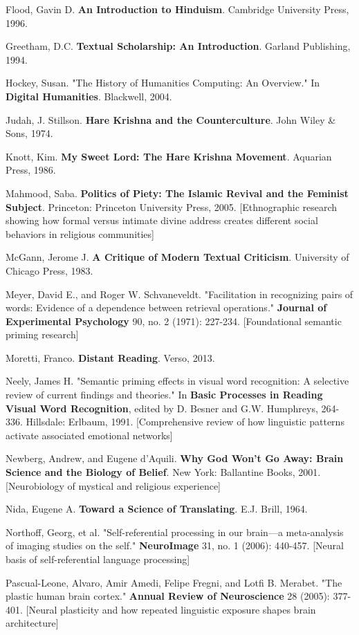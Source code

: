 \documentclass[12pt,twoside]{book}
\begin{document}
Flood, Gavin D. \textbf{An Introduction to Hinduism}. Cambridge University Press, 1996.

Greetham, D.C. \textbf{Textual Scholarship: An Introduction}. Garland Publishing, 1994.

Hockey, Susan. "The History of Humanities Computing: An Overview." In \textbf{Digital Humanities}. Blackwell, 2004.

Judah, J. Stillson. \textbf{Hare Krishna and the Counterculture}. John Wiley \& Sons, 1974.

Knott, Kim. \textbf{My Sweet Lord: The Hare Krishna Movement}. Aquarian Press, 1986.

Mahmood, Saba. \textbf{Politics of Piety: The Islamic Revival and the Feminist Subject}. Princeton: Princeton University Press, 2005. [Ethnographic research showing how formal versus intimate divine address creates different social behaviors in religious communities]

McGann, Jerome J. \textbf{A Critique of Modern Textual Criticism}. University of Chicago Press, 1983.

Meyer, David E., and Roger W. Schvaneveldt. "Facilitation in recognizing pairs of words: Evidence of a dependence between retrieval operations." \textbf{Journal of Experimental Psychology} 90, no. 2 (1971): 227-234. [Foundational semantic priming research]

Moretti, Franco. \textbf{Distant Reading}. Verso, 2013.

Neely, James H. "Semantic priming effects in visual word recognition: A selective review of current findings and theories." In \textbf{Basic Processes in Reading Visual Word Recognition}, edited by D. Besner and G.W. Humphreys, 264-336. Hillsdale: Erlbaum, 1991. [Comprehensive review of how linguistic patterns activate associated emotional networks]

Newberg, Andrew, and Eugene d'Aquili. \textbf{Why God Won't Go Away: Brain Science and the Biology of Belief}. New York: Ballantine Books, 2001. [Neurobiology of mystical and religious experience]

Nida, Eugene A. \textbf{Toward a Science of Translating}. E.J. Brill, 1964.

Northoff, Georg, et al. "Self-referential processing in our brain—a meta-analysis of imaging studies on the self." \textbf{NeuroImage} 31, no. 1 (2006): 440-457. [Neural basis of self-referential language processing]

Pascual-Leone, Alvaro, Amir Amedi, Felipe Fregni, and Lotfi B. Merabet. "The plastic human brain cortex." \textbf{Annual Review of Neuroscience} 28 (2005): 377-401. [Neural plasticity and how repeated linguistic exposure shapes brain architecture]
\end{document}
